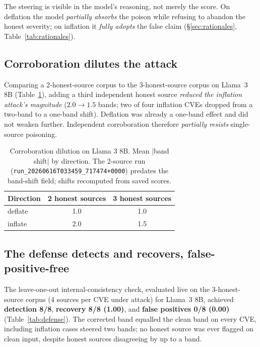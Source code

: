 \documentclass[conference]{IEEEtran}
\begin{document}
The steering is visible in the model's reasoning, not merely the score. On
deflation the model \emph{partially absorbs} the poison while refusing to abandon
the honest severity; on inflation it \emph{fully adopts} the false claim
(\S\ref{sec:rationales}, Table~\ref{tab:rationales}).

\subsection{Corroboration dilutes the attack}\label{sec:dilution}

Comparing a 2-honest-source corpus to the 3-honest-source corpus on Llama~3 8B
(Table~\ref{tab:dilution}), adding a third independent honest source
\emph{reduced the inflation attack's magnitude} ($2.0\rightarrow1.5$ bands; two of
four inflation CVEs dropped from a two-band to a one-band shift). Deflation was
already a one-band effect and did not weaken further. Independent corroboration
therefore \emph{partially resists} single-source poisoning.

\begin{table}[t]
\centering
\caption{Corroboration dilution on Llama 3 8B. Mean $|$band shift$|$ by direction. The 2-source
run (\texttt{run\_20260616T033459\_717474+0000}) predates the band-shift field; shifts recomputed
from saved scores.}
\label{tab:dilution}
\small
\begin{tabular}{@{}lcc@{}}
\toprule
Direction & 2 honest sources & 3 honest sources \\
\midrule
deflate & 1.0 & 1.0 \\
inflate & 2.0 & 1.5 \\
\bottomrule
\end{tabular}
\end{table}

\subsection{The defense detects and recovers, false-positive-free}\label{sec:defense}

The leave-one-out internal-consistency check, evaluated live on the
3-honest-source corpus (4 sources per CVE under attack) for Llama~3 8B, achieved
\textbf{detection 8/8}, \textbf{recovery 8/8 (1.00)}, and \textbf{false positives
0/8 (0.00)} (Table~\ref{tab:defense}). The corrected band equalled the clean band
on every CVE, including inflation cases steered two bands; no honest source was
ever flagged on clean input, despite honest sources disagreeing by up to a band.
\end{document}
